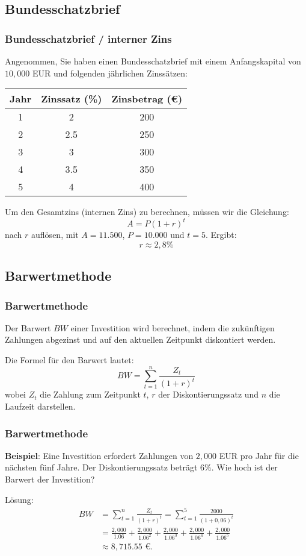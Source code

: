 \documentclass{beamer}
\begin{document}
\subsection{Bundesschatzbrief}
\begin{frame}
  \frametitle{Bundesschatzbrief / interner Zins}

  Angenommen, Sie haben einen Bundesschatzbrief mit einem Anfangskapital von $10,000$ EUR und folgenden jährlichen Zinssätzen:
  \begin{center}
    \begin{tabular}{|c|c|c|}
      \hline
      \textbf{Jahr} & \textbf{Zinssatz (\%)} & \textbf{Zinsbetrag (€)} \\
      \hline
      1 & 2 & 200\\
      2 & 2.5 & 250 \\
      3 & 3 & 300\\
      4 & 3.5 & 350\\
      5 & 4 & 400\\
      \hline
    \end{tabular}
  \end{center}
  Um den Gesamtzins (internen Zins) zu berechnen, müssen wir die Gleichung:
  $$ A = P (1+r)^t$$
  nach $r$ auflösen, mit $A=11.500$, $P=10.000$ und $t = 5$. Ergibt: 
  $$r\approx 2,8\%$$
\end{frame}

\subsection{Barwertmethode}
\begin{frame}
  \frametitle{Barwertmethode}
  Der Barwert $BW$ einer Investition wird berechnet, indem die zukünftigen Zahlungen abgezinst und auf den aktuellen Zeitpunkt diskontiert werden.
  
  \vspace{0.3cm}
  
  Die Formel für den Barwert lautet: $$BW = \sum_{t=1}^{n} \frac{Z_t}{(1+r)^t}$$ 
  wobei $Z_t$ die Zahlung zum Zeitpunkt $t$, $r$ der Diskontierungssatz und $n$ die Laufzeit darstellen.
  

\end{frame}


\begin{frame}
  \frametitle{Barwertmethode}
  
  \textbf{Beispiel}: Eine Investition erfordert Zahlungen von $2,000$ EUR pro Jahr für die nächsten fünf Jahre. Der Diskontierungssatz beträgt $6\%$. Wie hoch ist der Barwert der Investition?
  
  \vspace{0.3cm}
  
  Lösung:
  \begin{align*}
    BW &= \sum_{t=1}^{n} \frac{Z_t}{(1+r)^t} = \sum_{t=1}^{5} \frac{2000}{(1+0,06)^t}\\
    &= \frac{2,000}{1.06} + \frac{2,000}{1.06^2} + \frac{2,000}{1.06^3} + \frac{2,000}{1.06^4} + \frac{2,000}{1.06^5}\\  
    &\approx 8,715.55 \text{ €.}  
  \end{align*}
\end{frame}
\end{document}
